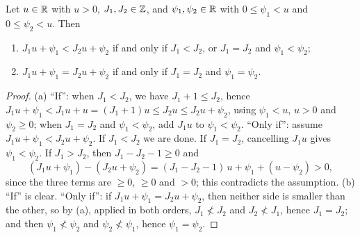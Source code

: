 \begin{lemma}\label{oc:lem:cell}
Let $u\in\mathbb R$ with $u>0$, $J_1,J_2\in\mathbb Z$, and $\psi_1,\psi_2\in\mathbb R$ with $0\le\psi_1<u$ and $0\le\psi_2<u$.
Then
\begin{enumerate}[label=(\alph*)]
\item $J_1u+\psi_1<J_2u+\psi_2$ if and only if $J_1<J_2$, or $J_1=J_2$ and $\psi_1<\psi_2$;
\item $J_1u+\psi_1=J_2u+\psi_2$ if and only if $J_1=J_2$ and $\psi_1=\psi_2$.
\end{enumerate}
\end{lemma}
\begin{proof}
(a) ``If'': when $J_1<J_2$, we have $J_1+1\le J_2$, hence
$J_1u+\psi_1<J_1u+u=(J_1+1)u\le J_2u\le J_2u+\psi_2$, using $\psi_1<u$, $u>0$ and $\psi_2\ge0$; when
$J_1=J_2$ and $\psi_1<\psi_2$, add $J_1u$ to $\psi_1<\psi_2$.
``Only if'': assume $J_1u+\psi_1<J_2u+\psi_2$. If $J_1<J_2$ we are done. If $J_1=J_2$, cancelling $J_1u$
gives $\psi_1<\psi_2$. If $J_1>J_2$, then $J_1-J_2-1\ge0$ and
\[(J_1u+\psi_1)-(J_2u+\psi_2)=(J_1-J_2-1)\,u+\psi_1+(u-\psi_2)>0,\]
since the three terms are $\ge0$, $\ge0$ and $>0$; this contradicts the assumption.
(b) ``If'' is clear. ``Only if'': if $J_1u+\psi_1=J_2u+\psi_2$, then neither side is smaller than the
other, so by (a), applied in both orders, $J_1\not<J_2$ and $J_2\not<J_1$, hence $J_1=J_2$; and then
$\psi_1\not<\psi_2$ and $\psi_2\not<\psi_1$, hence $\psi_1=\psi_2$.
\end{proof}

